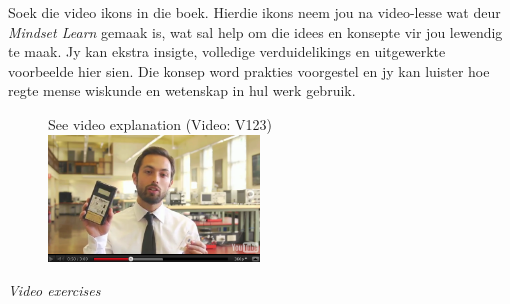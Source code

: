 {

Soek die video ikons in die boek. Hierdie ikons neem jou na video-lesse wat deur \textit{Mindset Learn} gemaak is, wat sal help om die idees en konsepte vir jou lewendig te maak. Jy kan ekstra insigte, volledige verduidelikings en uitgewerkte voorbeelde hier sien. Die konsep word prakties voorgestel en jy kan luister hoe regte mense wiskunde en wetenskap in hul werk gebruik. \par

\begin{figure}[h]
\begin{center}
See video explanation  (Video: V123)\\
\includegraphics[width=0.5\textwidth]{title_images/veritasiumvideo.png}
\end{center}
\end{figure}

}
{\normalfont\sffamily\fontsize{22}\normalfont\itshape Video exercises} \par

